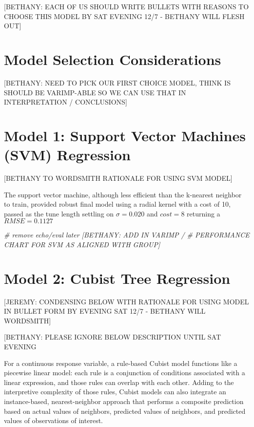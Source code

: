 \documentclass[]{report}
\newenvironment{Shaded}{\begin{snugshade}}{\end{snugshade}}
\newcommand{\CommentTok}[1]{\textcolor[rgb]{0.56,0.35,0.01}{\textit{#1}}}
\begin{document}
{[}BETHANY: EACH OF US SHOULD WRITE BULLETS WITH REASONS TO CHOOSE THIS
MODEL BY SAT EVENING 12/7 - BETHANY WILL FLESH OUT{]}

\hypertarget{model-selection-considerations}{%
\section{Model Selection
Considerations}\label{model-selection-considerations}}

{[}BETHANY: NEED TO PICK OUR FIRST CHOICE MODEL, THINK IS SHOULD BE
VARIMP-ABLE SO WE CAN USE THAT IN INTERPRETATION / CONCLUSIONS{]}

\hypertarget{model-1-support-vector-machines-svm-regression}{%
\section{Model 1: Support Vector Machines (SVM)
Regression}\label{model-1-support-vector-machines-svm-regression}}

{[}BETHANY TO WORDSMITH RATIONALE FOR USING SVM MODEL{]}

The support vector machine, although less efficient than the k-nearest
neighbor to train, provided robust final model using a radial kernel
with a cost of 10, passed as the tune length settling on
\(\sigma = 0.020\) and \(cost = 8\) returning a \(RMSE = 0.1127\)

\begin{Shaded}
\begin{Highlighting}[]
\CommentTok{# remove echo/eval later [BETHANY: ADD IN VARIMP /}
\CommentTok{# PERFORMANCE CHART FOR SVM AS ALIGNED WITH GROUP]}
\end{Highlighting}
\end{Shaded}

\hypertarget{model-2-cubist-tree-regression}{%
\section{Model 2: Cubist Tree
Regression}\label{model-2-cubist-tree-regression}}

{[}JEREMY: CONDENSING BELOW WITH RATIONALE FOR USING MODEL IN BULLET
FORM BY EVENING SAT 12/7 - BETHANY WILL WORDSMITH{]}

{[}BETHANY: PLEASE IGNORE BELOW DESCRIPTION UNTIL SAT EVENING

For a continuous response variable, a rule-based Cubist model functions
like a piecewise linear model: each rule is a conjunction of conditions
associated with a linear expression, and those rules can overlap with
each other. Adding to the interpretive complexity of those rules, Cubist
models can also integrate an instance-based, nearest-neighbor approach
that performs a composite prediction based on actual values of
neighbors, predicted values of neighbors, and predicted values of
observations of interest.
\end{document}
